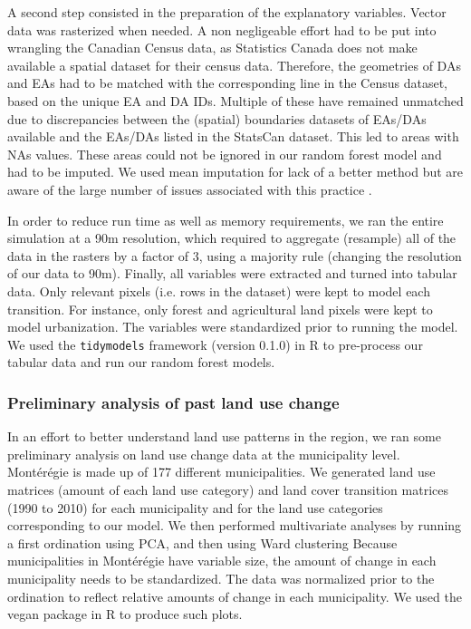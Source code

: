 A second step consisted in the preparation of the explanatory variables. Vector data was rasterized when needed. A non negligeable effort had to be put into wrangling the Canadian Census data, as Statistics Canada does not make available a spatial dataset for their census data. Therefore, the geometries of DAs and EAs had to be matched with the corresponding line in the Census dataset, based on the unique EA and DA IDs. Multiple of these have remained unmatched due to discrepancies between the (spatial) boundaries datasets of EAs/DAs available and the EAs/DAs listed in the StatsCan dataset. This led to areas with NAs values. These areas could not be ignored in our random forest model and had to be imputed. We used mean imputation for lack of a better method but are aware of the large number of issues associated with this practice \citep[see][]{lodder_impute_2014}.

In order to reduce run time as well as memory requirements, we ran the entire simulation at a 90m resolution, which required to aggregate (resample) all of the data in the rasters by a factor of 3, using a majority rule (changing the resolution of our data to 90m). Finally, all variables were extracted and turned into tabular data. Only relevant pixels (i.e. rows in the dataset) were kept to model each transition. For instance, only forest and agricultural land pixels were kept to model urbanization. The variables were standardized prior to running the model. We used the \verb|tidymodels| framework (version 0.1.0) in R to pre-process our tabular data and run our random forest models. \\

\subsubsection{Preliminary analysis of past land use change}

In an effort to better understand land use patterns in the region, we ran some preliminary analysis on land use change data at the municipality level. Montérégie is made up of 177 different municipalities. We generated land use matrices (amount of each land use category) and land cover transition matrices (1990 to 2010) for each municipality and for the land use categories corresponding to our model. We then performed multivariate analyses by running a first ordination using PCA, and then using Ward clustering %
Because municipalities in Montérégie have variable size, the amount of change in each municipality needs to be standardized. The data was normalized prior to the ordination to reflect relative amounts of change in each municipality. We used the vegan package in R to produce such plots.\\


